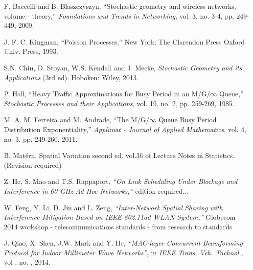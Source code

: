 \documentclass[10pt, conference, letterpaper]{IEEEtran}
\newcommand*{\Rom}[1]{\uppercase\expandafter{\romannumeral #1\relax}} %
\begin{document}
\begin{thebibliography}{50}
F. Baccelli and B. Blaszczyszyn, ``Stochastic geometry and wireless networks, volume \Rom{1} - theory,'' \emph{Foundations and Trends in Networking}, vol. 3, no. 3-4, pp. 249-449, 2009.

J. F. C. Kingman, ``Poisson Processes,'' New York: The Clarendon Press Oxford Univ. Press, 1993.

S.N. Chiu, D. Stoyan, W.S. Kendall and J. Mecke, \emph{Stochastic Geometry and its Applications} (3rd ed). Hoboken: Wiley, 2013. 

P. Hall, ``Heavy Traffic Approximations for Busy Period in an M/G/$\infty$ Queue,'' \emph{Stochastic Processes and their Applications}, vol. 19, no. 2, pp. 259-269, 1985.

M. A. M. Ferreira and M. Andrade, ``The M/G/$\infty$ Queue Busy Period Distribution Exponentiality,'' \emph{Applimat - Journal of Applied Mathematics}, vol. 4, no. 3, pp. 249-260, 2011.


B. Mat\'ern, Spatial Variation second ed. vol.36 of Lecture Notes in Statistics. (Revision required)





Z. He, S. Mao and T.S. Rappaport, \emph{``On Link Scheduling Under Blockage and Interference in 60-GHz Ad Hoc Networks,''} edition required...

W. Feng, Y. Li, D. Jin and L. Zeng, \emph{``Inter-Network Spatial Sharing with Interference Mitigation Based on IEEE 802.11ad WLAN System,''} Globecom 2014 workshop - telecommunications standards - from research to standards

J. Qiao, X. Shen, J.W. Mark and Y. He, \emph{``MAC-layer Concurrent Beamforming Protocol for Indoor Millimeter Wave Networks''}, in \emph{IEEE Trans. Veh. Tachnol.}, vol , no. ,   2014. 

\end{thebibliography}
\end{document}

